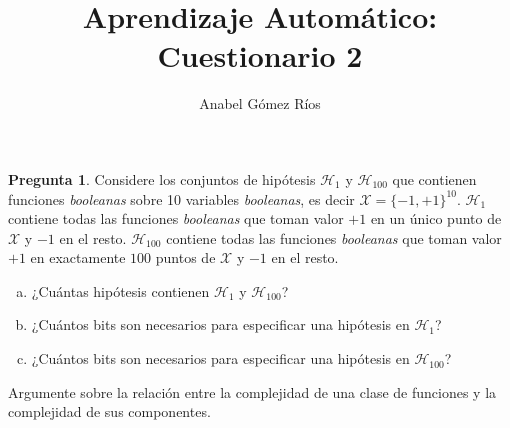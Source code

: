 \documentclass[12pt]{article}
\title{Aprendizaje Automático: Cuestionario 2}
\author{Anabel G\'omez R\'ios}
\theoremstyle{definition}
\begin{document}
\maketitle

\newtheorem{pregunta}{Pregunta}

\begin{pregunta}
Considere los conjuntos de hipótesis $\mathcal{H}_1$ y $\mathcal{H}_{100}$ que contienen funciones \textit{booleanas} sobre 10 variables \textit{booleanas}, es decir $\mathcal{X} = \{-1, +1\}^{10}$. $\mathcal{H}_1$ contiene todas las funciones \textit{booleanas} que toman valor $+1$ en un único punto de $\mathcal{X}$ y $-1$ en el resto. $\mathcal{H}_{100}$ contiene todas las funciones \textit{booleanas} que toman valor $+1$ en exactamente $100$ puntos de $\mathcal{X}$ y $-1$ en el resto.
\begin{enumerate}[a)]
\item ¿Cuántas hipótesis contienen $\mathcal{H}_1$ y $\mathcal{H}_{100}$?
\item ¿Cuántos bits son necesarios para especificar una hipótesis en $\mathcal{H}_1$?
\item ¿Cuántos bits son necesarios para especificar una hipótesis en $\mathcal{H}_{100}$?
\end{enumerate}

Argumente sobre la relación entre la complejidad de una clase de funciones y la complejidad de sus componentes.\\


\end{pregunta}
\end{document}
